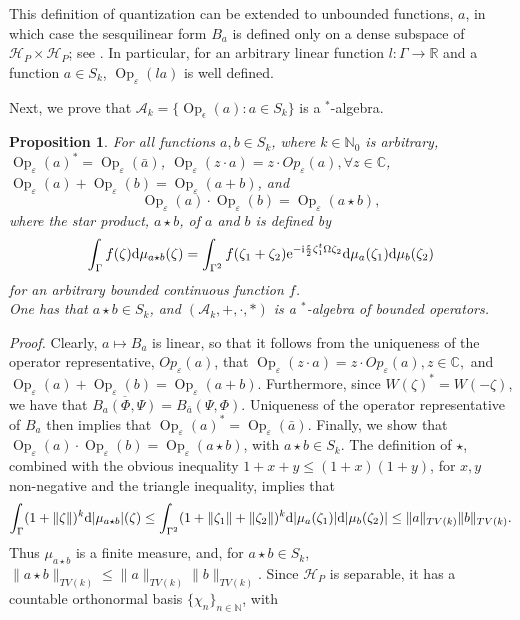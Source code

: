 \documentclass[12pt]{article}
\DeclareMathOperator{\Op}{Op}
\newcommand{\nn}{\mathbb{N}}
\newcommand{\rr}{\mathbb{R}}
\renewcommand{\d}{{\rm d}}
\newcommand{\e}{{\rm e}}
\renewcommand{\i}{{\rm i}}
\newtheorem{proposition}[theorem]{Proposition}
\begin{document}
This definition of quantization can be extended to unbounded functions, $a$, in which case the sesquilinear form 
$B_a$ is defined only on a dense subspace of $\mathcal H_P \times \mathcal{H}_P$; see \cite[\S VIII.6]{reed1980methods}. 
In particular, for an arbitrary linear function $l:\Gamma\to \rr$ and a function $a\in S_k$, $\Op_\varepsilon(la)$ is well defined.

Next, we prove that $\mathcal A_k=\{\Op_\epsilon(a): a\in S_k\}$ is a $^{*}$-algebra.
\begin{proposition}\label{prop:algebra}
For all functions $a,b\in S_k$, where $k \in \mathbb{N}_0$ is arbitrary, $\Op_{\varepsilon}(a)^*=\Op_{\varepsilon}(\bar a)$, 
$\Op_{\varepsilon}(z\cdot a)= z \cdot Op_{\varepsilon}(a), \forall z\in \mathbb{C}$, $\Op_\varepsilon(a)+\Op_\varepsilon(b)=\Op_\varepsilon(a + b)$, and 
$$\Op_\varepsilon(a)\cdot \Op_\varepsilon(b)=\Op_\varepsilon(a\star b),$$
where the star product, $a\star b$, of $a$ and $b$ is defined by
$$ \int_\Gamma f(\zeta)\d\mu_{a\star b}(\zeta)=\int_{\Gamma^2} f(\zeta_1+\zeta_2) \e^{-\i\frac\varepsilon2 \zeta_1^t\Omega\zeta_2}\d\mu_a(\zeta_1)\d\mu_b(\zeta_2)$$
for an arbitrary bounded continuous function $f$. \\
One has that $a\star b\in S_k$, and $(\mathcal A_k, +, \cdot, *)$ is a $^{*}$-algebra of bounded operators.
\end{proposition}
\noindent \textit{Proof.} Clearly, $a\mapsto B_a$ is linear, so that it follows from the uniqueness of the operator representative, 
$Op_{\varepsilon}(a)$, that $\Op_{\varepsilon}(z\cdot a)= z \cdot Op_{\varepsilon}(a), z \in \mathbb{C},$ and 
$\Op_\varepsilon(a)+\Op_\varepsilon(b)=\Op_\varepsilon(a+b)$. 
Furthermore, since $W(\zeta)^*=W(-\zeta)$, we have that $\overline{B_a(\Phi,\Psi)}=B_{\bar a}(\Psi,\Phi)$. 
Uniqueness of the operator representative of $B_a$ then implies that $\Op_\varepsilon(a)^*=\Op_{\varepsilon}(\bar a)$.
Finally, we show that $\Op_\varepsilon(a)\cdot \Op_{\varepsilon}(b)=\Op_\varepsilon(a\star b)$, with $a\star b\in S_k$. 
The definition of $\star$, combined with the obvious inequality $1+x+y\leq (1+x)(1+y)$, for $x, y$ non-negative
and the triangle inequality, implies that
$$\int_\Gamma  (1+\|\zeta\|)^k\d|\mu_{a\star b}|(\zeta)\leq\int_{\Gamma^2}(1+\|\zeta_1\|+\|\zeta_2\|)^k\d|\mu_a(\zeta_1)|\d|\mu_b(\zeta_2)|\leq\|a\|_{TV(k)}\|b\|_{TV(k)}.$$
Thus $\mu_{a\star b}$ is a finite measure, and, for $a\star b\in S_k$, $\|a\star b\|_{TV(k)}\leq \|a\|_{TV(k)}\|b\|_{TV(k)}$.
Since $\mathcal H_P$ is separable, it has a countable orthonormal basis $\{\chi_n\}_{n\in \nn}$, with 
\end{document}
